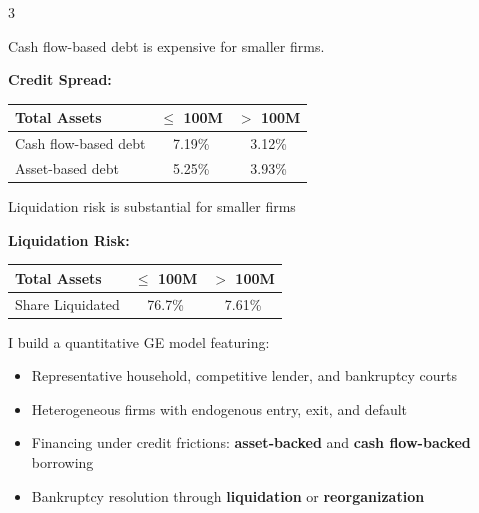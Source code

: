 \documentclass[10pt]{article}
\begin{document}
\begin{multicols}{3}
\begin{tcolorbox}[title=Empirical Motivation]
Cash flow-based debt is expensive for smaller firms.

\vspace{1.25mm}

\small
\begin{minipage}{0.21\textwidth}
    \centering
    \vspace{5mm}
    \textbf{Credit Spread:}
\end{minipage}
\begin{minipage}{0.56\textwidth}
    \centering
    \begin{tabular}{lcc}
        \toprule
        Total Assets & \textbf{$\leq$ 100M} & \textbf{$>$ 100M} \\
        \midrule
        Cash flow-based debt & 7.19\% & 3.12\% \\
        Asset-based debt & 5.25\% & 3.93\% \\
        \bottomrule
    \end{tabular}
\end{minipage}
\normalsize

\vspace{3mm}
\normalsize

\raggedright
Liquidation risk is substantial for smaller firms

\vspace{1.25mm}

\small
\begin{minipage}{0.20\textwidth}
    \centering
    \vspace{3mm}
    \textbf{Liquidation Risk:}
\end{minipage}
\begin{minipage}{0.56\textwidth}
    \centering
    \begin{tabular}{lcc}
        \toprule
        Total Assets & \textbf{$\leq$ 100M} & \textbf{$>$ 100M} \\
        \midrule
        Share Liquidated & 76.7\% & 7.61\% \\
        \bottomrule
    \end{tabular}
\end{minipage}
\normalsize


\normalsize
\end{tcolorbox}

\begin{tcolorbox}[title=What I Do]
I build a quantitative GE model featuring:
\begin{itemize}
    \item Representative household, competitive lender, and bankruptcy courts
    \item Heterogeneous firms with endogenous entry, exit, and default
    \item Financing under credit frictions: \textbf{asset-backed} and \textbf{cash flow-backed} borrowing
    \item Bankruptcy resolution through \textbf{liquidation} or \textbf{reorganization}
\end{itemize}



\end{tcolorbox}
\end{multicols}
\end{document}
